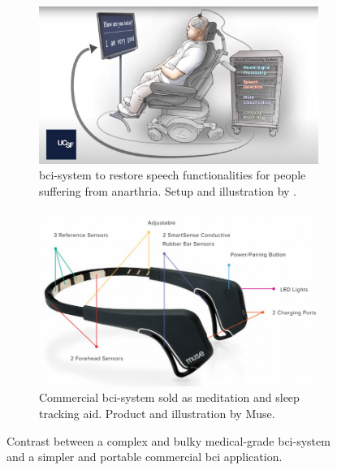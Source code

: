 \begin{figure}[ht]
  \begin{minipage}{\textwidth}
    \centering
    \begin{subfigure}{.48\textwidth}
        \centering
        \includegraphics[width=\textwidth]{images/introduction/fb_bci_keyboard.jpg}
        \captionsetup{width=0.9\linewidth}
        \captionsetup{justification=centering}
        \caption{\gls{bci}-system to restore speech functionalities for people suffering from anarthria. Setup and illustration by \citet{facebook_bci_keyboard}.}
        \label{fig:intro_medical_vs_commercial_1}
    \end{subfigure}
    \hfill
    \begin{subfigure}{.48\textwidth}
        \centering
        \includegraphics[width=\textwidth]{images/introduction/muse.png}
        \captionsetup{width=0.9\linewidth}
        \captionsetup{justification=centering}
        \caption{Commercial \gls{bci}-system sold as meditation and sleep tracking aid. Product and illustration by Muse\footnotemark[1].}
        \label{fig:intro_medical_vs_commercial_2}
    \end{subfigure}
    \captionsetup{width=0.9\linewidth}
    \captionsetup{justification=centering}
    \caption{Contrast between a complex and bulky medical-grade \gls{bci}-system and a simpler and portable commercial \gls{bci} application.}
    \label{fig:intro_medical_vs_commercial}
  \end{minipage}  
\end{figure}

